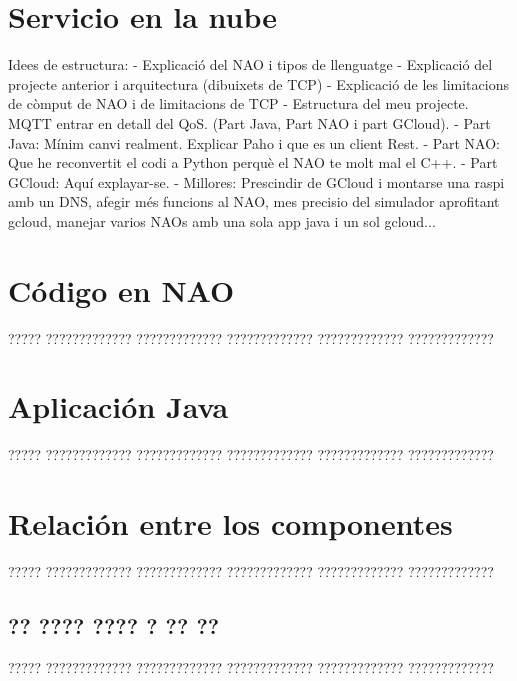 \documentclass[12pt,spanish,listoffigures,listoftables]{tfgetsinf}
\begin{document}
\chapter{Servicio en la nube}

Idees de estructura:
- Explicació del NAO i tipos de llenguatge
- Explicació del projecte anterior i arquitectura (dibuixets de TCP)
- Explicació de les limitacions de còmput de NAO i de limitacions de TCP
- Estructura del meu projecte. MQTT entrar en detall del QoS. (Part Java, Part NAO i part GCloud).
- Part Java: Mínim canvi realment. Explicar Paho i que es un client Rest.
- Part NAO: Que he reconvertit el codi a Python perquè el NAO te molt mal el C++. 
- Part GCloud: Aquí explayar-se.
- Millores: Prescindir de GCloud i montarse una raspi amb un DNS, afegir més funcions al NAO, mes precisio del simulador aprofitant gcloud, manejar varios NAOs amb una sola app java i un sol gcloud...

\chapter{Código en NAO}

????? ????????????? ????????????? ????????????? ????????????? ?????????????

\chapter{Aplicación Java}

????? ????????????? ????????????? ????????????? ????????????? ?????????????

\chapter{Relación entre los componentes}

????? ????????????? ????????????? ????????????? ????????????? ????????????? 

\section{?? ???? ???? ? ?? ??}

????? ????????????? ????????????? ????????????? ????????????? ?????????????

\end{document}
